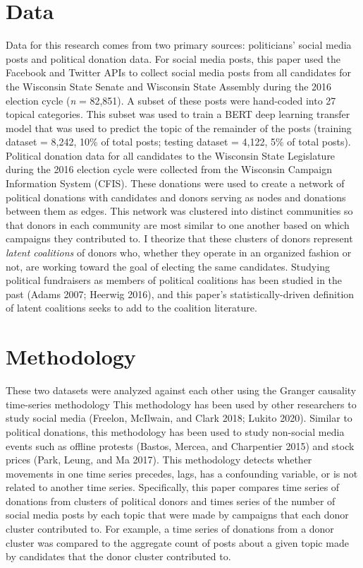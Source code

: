 \documentclass[12pt,]{article}
\begin{document}
\hypertarget{data}{%
\section{Data}\label{data}}

Data for this research comes from two primary sources: politicians'
social media posts and political donation data. For social media posts,
this paper used the Facebook and Twitter APIs to collect social media
posts from all candidates for the Wisconsin State Senate and Wisconsin
State Assembly during the 2016 election cycle (\emph{n} = 82,851). A
subset of these posts were hand-coded into 27 topical categories. This
subset was used to train a BERT deep learning transfer model that was
used to predict the topic of the remainder of the posts (training
dataset = 8,242, 10\% of total posts; testing dataset = 4,122, 5\% of
total posts). Political donation data for all candidates to the
Wisconsin State Legislature during the 2016 election cycle were
collected from the Wisconsin Campaign Information System (CFIS). These
donations were used to create a network of political donations with
candidates and donors serving as nodes and donations between them as
edges. This network was clustered into distinct communities so that
donors in each community are most similar to one another based on which
campaigns they contributed to. I theorize that these clusters of donors
represent \emph{latent coalitions} of donors who, whether they operate
in an organized fashion or not, are working toward the goal of electing
the same candidates. Studying political fundraisers as members of
political coalitions has been studied in the past (Adams 2007; Heerwig
2016), and this paper's statistically-driven definition of latent
coalitions seeks to add to the coalition literature.

\hypertarget{methodology}{%
\section{Methodology}\label{methodology}}

These two datasets were analyzed against each other using the Granger
causality time-series methodology This methodology has been used by
other researchers to study social media (Freelon, McIlwain, and Clark
2018; Lukito 2020). Similar to political donations, this methodology has
been used to study non-social media events such as offline protests
(Bastos, Mercea, and Charpentier 2015) and stock prices (Park, Leung,
and Ma 2017). This methodology detects whether movements in one time
series precedes, lags, has a confounding variable, or is not related to
another time series. Specifically, this paper compares time series of
donations from clusters of political donors and times series of the
number of social media posts by each topic that were made by campaigns
that each donor cluster contributed to. For example, a time series of
donations from a donor cluster was compared to the aggregate count of
posts about a given topic made by candidates that the donor cluster
contributed to.
\end{document}
